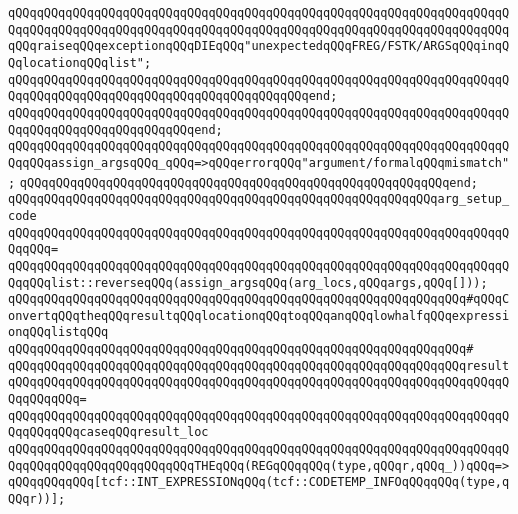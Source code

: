 \verb|qQQqqQQqqQQqqQQqqQQqqQQqqQQqqQQqqQQqqQQqqQQqqQQqqQQqqQQqqQQqqQQqqQQqqQQqqQQqqQQqqQQqqQQqqQQqqQQqqQQqqQQqqQQqqQQqqQQqqQQqqQQqqQQqqQQqqQQqqQQqqQQqraiseqQQqexceptionqQQqDIEqQQq"unexpectedqQQqFREG/FSTK/ARGSqQQqinqQQqlocationqQQqlist";|\newline
\verb|qQQqqQQqqQQqqQQqqQQqqQQqqQQqqQQqqQQqqQQqqQQqqQQqqQQqqQQqqQQqqQQqqQQqqQQqqQQqqQQqqQQqqQQqqQQqqQQqqQQqqQQqqQQqqQQqend;|\newline
\newline
\verb|qQQqqQQqqQQqqQQqqQQqqQQqqQQqqQQqqQQqqQQqqQQqqQQqqQQqqQQqqQQqqQQqqQQqqQQqqQQqqQQqqQQqqQQqqQQqqQQqend;|\newline
\newline
\verb|qQQqqQQqqQQqqQQqqQQqqQQqqQQqqQQqqQQqqQQqqQQqqQQqqQQqqQQqqQQqqQQqqQQqqQQqqQQqassign_argsqQQq_qQQq=>qQQqerrorqQQq"argument/formalqQQqmismatch";|\newline
\verb|qQQqqQQqqQQqqQQqqQQqqQQqqQQqqQQqqQQqqQQqqQQqqQQqqQQqqQQqqQQqend;|\newline
\newline
\verb|qQQqqQQqqQQqqQQqqQQqqQQqqQQqqQQqqQQqqQQqqQQqqQQqqQQqqQQqqQQqarg_setup_code|\newline
\verb|qQQqqQQqqQQqqQQqqQQqqQQqqQQqqQQqqQQqqQQqqQQqqQQqqQQqqQQqqQQqqQQqqQQqqQQqqQQq=|\newline
\verb|qQQqqQQqqQQqqQQqqQQqqQQqqQQqqQQqqQQqqQQqqQQqqQQqqQQqqQQqqQQqqQQqqQQqqQQqqQQqlist::reverseqQQq(assign_argsqQQq(arg_locs,qQQqargs,qQQq[]));|\newline
\newline
\verb|qQQqqQQqqQQqqQQqqQQqqQQqqQQqqQQqqQQqqQQqqQQqqQQqqQQqqQQqqQQqqQQq#qQQqConvertqQQqtheqQQqresultqQQqlocationqQQqtoqQQqanqQQqlowhalfqQQqexpressionqQQqlistqQQq|\newline
\verb|qQQqqQQqqQQqqQQqqQQqqQQqqQQqqQQqqQQqqQQqqQQqqQQqqQQqqQQqqQQqqQQq#|\newline
\verb|qQQqqQQqqQQqqQQqqQQqqQQqqQQqqQQqqQQqqQQqqQQqqQQqqQQqqQQqqQQqqQQqresult|\newline
\verb|qQQqqQQqqQQqqQQqqQQqqQQqqQQqqQQqqQQqqQQqqQQqqQQqqQQqqQQqqQQqqQQqqQQqqQQqqQQqqQQq=|\newline
\verb|qQQqqQQqqQQqqQQqqQQqqQQqqQQqqQQqqQQqqQQqqQQqqQQqqQQqqQQqqQQqqQQqqQQqqQQqqQQqqQQqcaseqQQqresult_loc|\newline
\newline
\verb|qQQqqQQqqQQqqQQqqQQqqQQqqQQqqQQqqQQqqQQqqQQqqQQqqQQqqQQqqQQqqQQqqQQqqQQqqQQqqQQqqQQqqQQqqQQqqQQqTHEqQQq(REGqQQqqQQq(type,qQQqr,qQQq_))qQQq=>qQQqqQQqqQQq[tcf::INT_EXPRESSIONqQQq(tcf::CODETEMP_INFOqQQqqQQq(type,qQQqr))];|\newline
